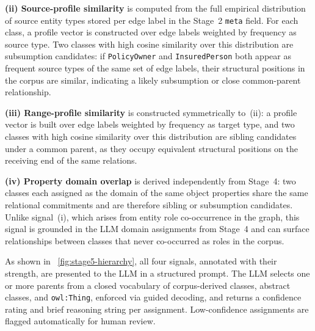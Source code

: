 \documentclass[sigconf]{acmart}
\begin{document}
\textbf{(ii) Source-profile similarity} is computed from the full 
empirical distribution of source entity types stored per edge label in 
the Stage~2 \texttt{meta} field. For each class, a profile vector is 
constructed over edge labels weighted by frequency as source type. Two 
classes with high cosine similarity over this distribution are 
subsumption candidates: if \texttt{PolicyOwner} and 
\texttt{InsuredPerson} both appear as frequent source types of the same 
set of edge labels, their structural positions in the corpus are similar, 
indicating a likely subsumption or close common-parent relationship.

\textbf{(iii) Range-profile similarity} is constructed symmetrically 
to~(ii): a profile vector is built over edge labels weighted by frequency 
as target type, and two classes with high cosine similarity over this 
distribution are sibling candidates under a common parent, as they occupy 
equivalent structural positions on the receiving end of the same 
relations.

\textbf{(iv) Property domain overlap} is derived independently from 
Stage~4: two classes each assigned as the domain of the same object 
properties share the same relational commitments and are therefore 
sibling or subsumption candidates. Unlike signal~(i), which arises from 
entity role co-occurrence in the graph, this signal is grounded in the 
LLM domain assignments from Stage~4 and can surface relationships between 
classes that never co-occurred as roles in the corpus.


As shown in ~\autoref{fig:stage5-hierarchy}, all four signals, annotated with their strength, are presented to the
LLM in a structured prompt.
The LLM selects one or more parents from a closed vocabulary of corpus-derived
classes, abstract classes, and \texttt{owl:Thing}, enforced via guided
decoding, and returns a confidence rating and brief reasoning string per
assignment.
Low-confidence assignments are flagged automatically for human review.

\vspace{-2pt}
\end{document}
